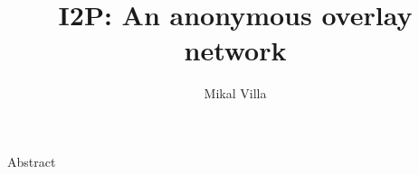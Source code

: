 \documentclass[a4paper,twocolumn,12pt]{article}
\title{I2P: An anonymous overlay network}
\author{Mikal Villa}
\begin{document}
\maketitle

Abstract
\end{document}
